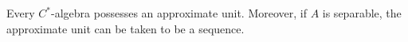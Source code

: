 Every $C^*$-algebra possesses an approximate unit. Moreover, if $A$ is separable, the approximate unit can be taken to be a sequence.
